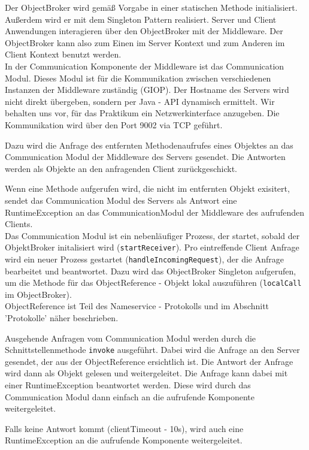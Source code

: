 \documentclass{article}
\begin{document}
Der ObjectBroker wird gemäß Vorgabe in einer statischen Methode initialisiert. Außerdem wird er mit dem
Singleton Pattern realisiert. Server und Client Anwendungen interagieren über den ObjectBroker mit der Middleware.
Der ObjectBroker kann also zum Einen im Server Kontext und zum Anderen im Client Kontext benutzt werden.\\

In der Communication Komponente der Middleware ist das Communication Modul. Dieses Modul ist für die Kommunikation
zwischen verschiedenen Instanzen der Middleware zuständig (GIOP).
Der Hostname des Servers wird nicht direkt übergeben, sondern per Java - API
dynamisch ermittelt. Wir behalten uns vor, für das Praktikum ein Netzwerkinterface anzugeben.
Die Kommunikation wird über den Port 9002 via TCP geführt. 

Dazu wird die Anfrage des entfernten Methodenaufrufes eines Objektes an das Communication Modul der Middleware des
Servers gesendet. Die Antworten werden als Objekte an den anfragenden Client zurückgeschickt.

Wenn eine Methode aufgerufen wird, die nicht im entfernten Objekt exisitert, sendet das Communication Modul des Servers
als Antwort eine RuntimeException an das CommunicationModul der Middleware des aufrufenden Clients.\\

Das Communication Modul ist ein nebenläufiger Prozess, der startet, sobald der ObjektBroker initalisiert wird
(\texttt{startReceiver}). Pro eintreffende Client Anfrage wird ein neuer Prozess gestartet
(\texttt{handleIncomingRequest}), der die Anfrage bearbeitet und beantwortet. Dazu wird das ObjectBroker Singleton
aufgerufen, um die Methode für das ObjectReference - Objekt lokal auszuführen (\texttt{localCall} im ObjectBroker).\\
ObjectReference ist Teil des Nameservice - Protokolls und im Abschnitt 'Protokolle' näher beschrieben.

Ausgehende Anfragen vom Communication Modul werden durch die Schnittstellenmethode \texttt{invoke} ausgeführt.
Dabei wird die Anfrage an den Server gesendet, der aus der ObjectReference ersichtlich ist. Die Antwort der Anfrage
wird dann als Objekt gelesen und weitergeleitet. Die Anfrage kann dabei mit einer RuntimeException beantwortet werden.
Diese wird durch das Communication Modul dann einfach an die aufrufende Komponente weitergeleitet.

Falls keine Antwort kommt (clientTimeout - 10s), wird auch eine RuntimeException an die aufrufende Komponente
weitergeleitet.\\
\end{document}
